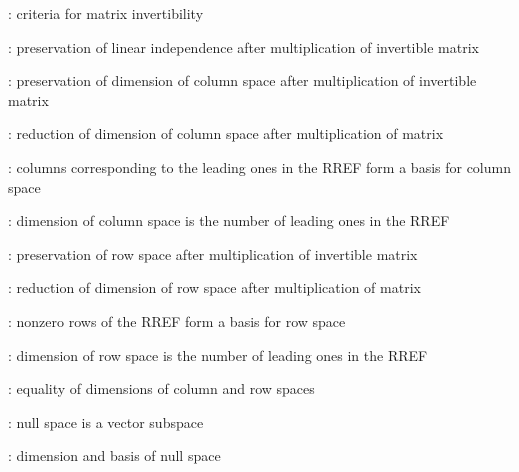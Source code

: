 \item {}: criteria for matrix invertibility
\item {}: preservation of linear independence after multiplication of invertible matrix
\item {}: preservation of dimension of column space after multiplication of invertible matrix
\item {}: reduction of dimension of column space after multiplication of matrix
\item {}: columns corresponding to the leading ones in the RREF form a basis for column space
\item {}: dimension of column space is the number of leading ones in the RREF
\item {}: preservation of row space after multiplication of invertible matrix
\item {}: reduction of dimension of row space after multiplication of matrix
\item {}: nonzero rows of the RREF form a basis for row space
\item {}: dimension of row space is the number of leading ones in the RREF
\item {}: equality of dimensions of column and row spaces
\item {}: null space is a vector subspace
\item {}: dimension and basis of null space

